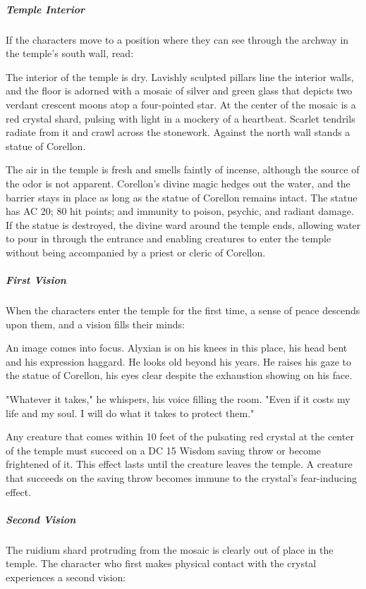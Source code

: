 \documentclass[10pt,a4paper,twoside,fancy,bg=print,twocolumn,openany,nodeprecatedcode]{dndbook}
\begin{document}
\subparagraph{Temple Interior}
If the characters move to a position where they can see through the archway in the temple's south wall, read:

\begin{DndReadAloud}{}
The interior of the temple is dry. Lavishly sculpted pillars line the interior walls, and the floor is adorned with a mosaic of silver and green glass that depicts two verdant crescent moons atop a four-pointed star. At the center of the mosaic is a red crystal shard, pulsing with light in a mockery of a heartbeat. Scarlet tendrils radiate from it and crawl across the stonework. Against the north wall stands a statue of Corellon.

\end{DndReadAloud}

The air in the temple is fresh and smells faintly of incense, although the source of the odor is not apparent. Corellon's divine magic hedges out the water, and the barrier stays in place as long as the statue of Corellon remains intact. The statue has AC 20; 80 hit points; and immunity to poison, psychic, and radiant damage. If the statue is destroyed, the divine ward around the temple ends, allowing water to pour in through the entrance and enabling creatures to enter the temple without being accompanied by a priest or cleric of Corellon.

\subparagraph{First Vision}
When the characters enter the temple for the first time, a sense of peace descends upon them, and a vision fills their minds:

\begin{DndReadAloud}{}
An image comes into focus. Alyxian is on his knees in this place, his head bent and his expression haggard. He looks old beyond his years. He raises his gaze to the statue of Corellon, his eyes clear despite the exhaustion showing on his face.

"Whatever it takes," he whispers, his voice filling the room. "Even if it costs my life and my soul. I will do what it takes to protect them."

\end{DndReadAloud}

Any creature that comes within 10 feet of the pulsating red crystal at the center of the temple must succeed on a DC 15 Wisdom saving throw or become frightened of it. This effect lasts until the creature leaves the temple. A creature that succeeds on the saving throw becomes immune to the crystal's fear-inducing effect.

\subparagraph{Second Vision}
The ruidium shard protruding from the mosaic is clearly out of place in the temple. The character who first makes physical contact with the crystal experiences a second vision:
\end{document}
